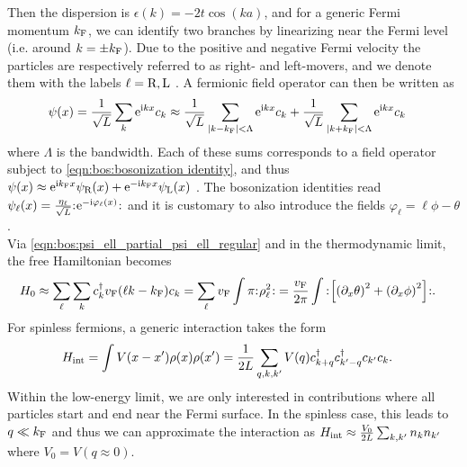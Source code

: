 Then the dispersion is $\epsilon(k) = -2t\cos(ka)$, and for a generic Fermi momentum $\kf$, we can identify two branches by linearizing near the Fermi level (i.e. around $k=\pm \kf$).
Due to the positive and negative Fermi velocity the particles are respectively referred to as right- and left-movers, and we denote them with the labels $\ell=\R,\L$ \cite{Bosonization_DelftSchoeller_1998,Giamarchi_2004}.
A fermionic field operator can then be written as
\begin{align*}
\psi(x) &= \frac{1}{\sqrt{L}} \sum_k \powe{\i kx} c_k \approx \frac{1}{\sqrt{L}} \sum_{|k-\kf|<\Lambda} \powe{\i kx} c_k + \frac{1}{\sqrt{L}}\sum_{|k+\kf|<\Lambda} \powe{\i kx} c_k
\end{align*}
where $\Lambda$ is the bandwidth.
Each of these sums corresponds to a field operator subject to \autoref{eqn:bos:bosonization identity}, and thus $\psi(x) \approx \powe{\i \kf x} \psi_\R(x) + \powe{-\i \kf x} \psi_\L(x)$ \cite{Bosonization_Miranda_2003}.
The bosonization identities read $\psi_\ell(x) = \frac{\eta_\ell}{\sqrt{L}} \normord{\powe{-\i\varphi_\ell(x)}}$ and it is customary to also introduce the fields $\varphi_\ell = \ell \phi - \theta$ \cite{Giamarchi_2004}.\\
Via \autoref{eqn:bos:psi_ell_partial_psi_ell_regular} and in the thermodynamic limit, the free Hamiltonian becomes \cite{QImpurity_review_Furusaki_2005}
\begin{align*}
H_0 &\approx \sum_\ell \sum_k c_k^\dagger \vf(\ell k - \kf) c_k = \sum_\ell \vf \int\pi \normord{\rho_\ell^2} = \frac{\vf}{2\pi} \int \normord{\klb*{\kla*{\partial_x\theta}^2 + \kla*{\partial_x\phi}^2}}.
\end{align*}%
For spinless fermions, a generic interaction takes the form \cite[]{Giamarchi_2004}
\begin{align*}
H_\tint &= \int V(x-x')\rho(x)\rho(x') = \frac{1}{2L} \sum_{q,k,k'} V(q) c_{k+q}^\dagger c_{k'-q}^\dagger c_{k'} c_{k}.
\end{align*}
Within the low-energy limit, we are only interested in contributions where all particles start and end near the Fermi surface.
In the spinless case, this leads to $q\ll \kf$ and thus we can approximate the interaction as $H_\tint \approx \frac{V_0}{2L} \sum_{k,k'} n_k n_{k'}$ where $V_0 = V(q\approx 0)$.
